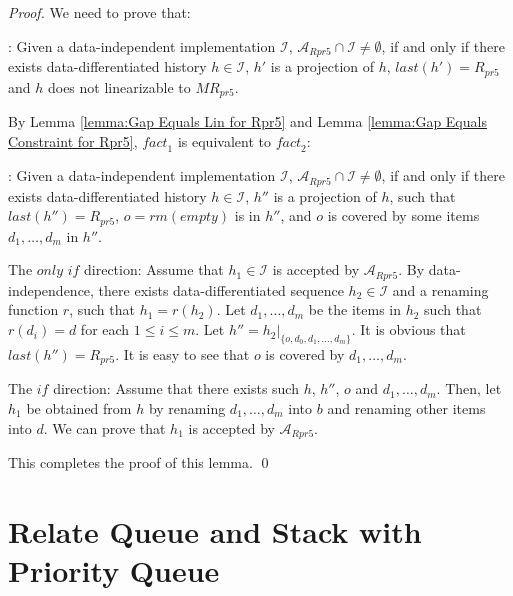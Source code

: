 \begin {proof}

We need to prove that:

: Given a data-independent implementation $\mathcal{I}$, $\mathcal{A}_{\textit{Rpr5}} \cap \mathcal{I} \neq \emptyset$, if and only if there exists data-differentiated history $h \in \mathcal{I}$, $h'$ is a projection of $h$, $\textit{last}(h') = R_{\textit{pr5}}$ and $h$ does not linearizable to $\textit{MR}_{\textit{pr5}}$.

By Lemma \ref{lemma:Gap Equals Lin for Rpr5} and Lemma \ref{lemma:Gap Equals Constraint for Rpr5}, $\textit{fact}_1$ is equivalent to $\textit{fact}_2$:

: Given a data-independent implementation $\mathcal{I}$, $\mathcal{A}_{\textit{Rpr5}} \cap \mathcal{I} \neq \emptyset$, if and only if there exists data-differentiated history $h \in \mathcal{I}$, $h''$ is a projection of $h$, such that $\textit{last}(h'') = R_{\textit{pr5}}$, $o = \textit{rm}(\textit{empty})$ is in $h''$, and $o$ is covered by some items $d_1,\ldots,d_m$ in $h''$.


\noindent The $\textit{only if}$ direction: Assume that $h_1 \in \mathcal{I}$ is accepted by $\mathcal{A}_{\textit{Rpr5}}$. By data-independence, there exists data-differentiated sequence $h_2 \in \mathcal{I}$ and a renaming function $r$, such that $h_1=r(h_2)$. Let $d_1,\ldots,d_m$ be the items in $h_2$ such that $r(d_i)=d$ for each $1 \leq i \leq m$. Let $h'' = h_2 \vert_{ \{ o, d_0, d_1, \ldots, d_m \} }$. It is obvious that $\textit{last}(h'') = R_{\textit{pr5}}$. It is easy to see that $o$ is covered by $d_1,\ldots,d_m$.

\noindent The $\textit{if}$ direction: Assume that there exists such $h$, $h''$, $o$ and $d_1,\ldots,d_m$. Then, let $h_1$ be obtained from $h$ by renaming $d_1,\ldots,d_m$ into $b$ and renaming other items into $d$. We can prove that $h_1$ is accepted by $\mathcal{A}_{\textit{Rpr5}}$.

This completes the proof of this lemma. \qed
\end {proof}




\section{Relate Queue and Stack with Priority Queue}
\label{sec:relate queue and stack with priority queue}




